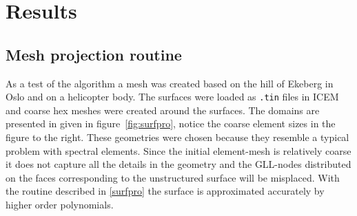 
\chapter{Results} %

\label{results} %




\section{Mesh projection routine}
As a test of the algorithm a mesh was created based on the hill of Ekeberg in Oslo 
and on a helicopter body.
The surfaces were loaded as \verb|.tin| files in ICEM and coarse hex meshes were created 
around the surfaces. The domains are presented in given in 
figure~\ref{fig:surfpro}, notice the coarse element sizes in the figure to the right.
These geometries were chosen because they resemble a typical problem with 
spectral elements. Since the initial element-mesh is relatively coarse it does not capture all 
the details in the geometry and the GLL-nodes distributed on the faces corresponding to the 
unstructured surface will be misplaced. 
With the routine described in \cref{surfpro} the surface is approximated accurately 
by higher order polynomials.
%
